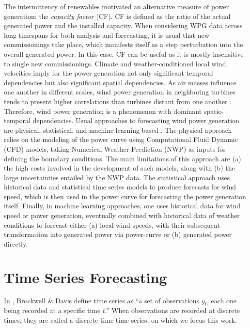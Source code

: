 The intermittency of renewables motivated an alternative measure of power generation: the \textit{capacity factor} (CF).
CF is defined as the ratio of the actual generated power and the installed capacity. When considering WPG data across long timespans for both analysis and forecasting, it is usual that new commissionings take place, which manifests itself as a step perturbation into the overall generated power. In this case, CF can be useful as it is mostly insensitive to single new commissionings.
Climate and weather-conditioned local wind velocities imply for the power generation not only significant temporal dependencies but also significant spatial dependencies. As air masses influence one another in different scales, wind power generation in neighboring turbines tends to present higher correlations than turbines distant from one another \cite{engeland2017variability}. Therefore, wind power generation is a phenomenon with dominant spatio-temporal dependencies.
Usual approaches to forecasting wind power generation are physical, statistical, and machine learning-based \cite{jung2014forecasting}. The physical approach relies on the modeling of the power curve using Computational Fluid Dynamic (CFD) models, taking Numerical Weather Prediction (NWP) as inputs for defining the boundary conditions. The main limitations of this approach are (a) the high costs involved in the development of such models, along with (b) the large uncertainties entailed by the NWP data. The statistical approach uses historical data and statistical time series models to produce forecasts for wind speed, which is then used in the power curve for forecasting the power generation itself. Finally, in machine learning approaches, one uses historical data for wind speed or power generation, eventually combined with historical data of weather conditions to forecast either (a) local wind speeds, with their subsequent transformation into generated power via power-curve or (b) generated power directly.

\section{Time Series Forecasting}

In \cite{brockwell1996introduction}, Brockwell \& Davis define time series as ``a set of observations $y_t$, each one being recorded at a specific time $t$.'' When observations are recorded at discrete times, they are called a discrete-time time series, on which we focus this work.

